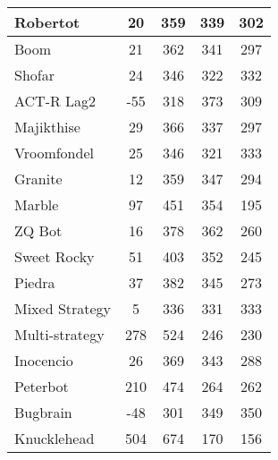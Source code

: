 \begin{table*}
\begin{tabular}{|l|c|c|c|c|}
Robertot & 20 & 359 & 339 & 302 \\ \hline 
Boom & 21 & 362 & 341 & 297 \\ \hline 
Shofar & 24 & 346 & 322 & 332 \\ \hline 
ACT-R Lag2 & -55 & 318 & 373 & 309 \\ \hline 
Majikthise & 29 & 366 & 337 & 297 \\ \hline 
Vroomfondel & 25 & 346 & 321 & 333 \\ \hline 
Granite & 12 & 359 & 347 & 294 \\ \hline 
Marble & 97 & 451 & 354 & 195 \\ \hline 
ZQ Bot & 16 & 378 & 362 & 260 \\ \hline 
Sweet Rocky & 51 & 403 & 352 & 245 \\ \hline 
Piedra & 37 & 382 & 345 & 273 \\ \hline 
Mixed Strategy & 5 & 336 & 331 & 333 \\ \hline 
Multi-strategy & 278 & 524 & 246 & 230 \\ \hline 
Inocencio & 26 & 369 & 343 & 288 \\ \hline 
Peterbot & 210 & 474 & 264 & 262 \\ \hline 
Bugbrain & -48 & 301 & 349 & 350 \\ \hline 
Knucklehead & 504 & 674 & 170 & 156 \\ \hline
        \end{tabular}
    \end{table*}